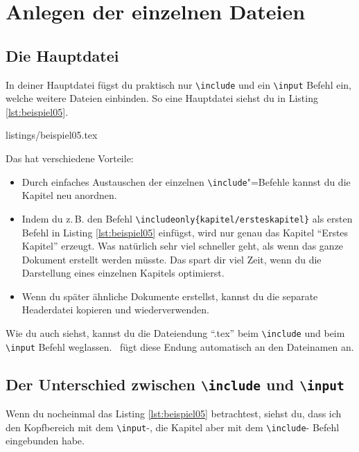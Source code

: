 \section{Anlegen der einzelnen Dateien}

\subsection{Die Hauptdatei}

In deiner Hauptdatei fügst du praktisch nur \texttt{\textbackslash include} und ein \texttt{\textbackslash input} Befehl ein, welche weitere Dateien einbinden. So eine Hauptdatei siehst du in Listing \ref{lst:beispiel05}.

%
	{listings/beispiel05.tex}

Das hat verschiedene Vorteile:

\begin{itemize}
	\item Durch einfaches Austauschen der einzelnen \texttt{\textbackslash include}"=Befehle kannst du die Kapitel neu anordnen.
	\item Indem du z.\,B. den Befehl \texttt{\textbackslash includeonly\{kapitel/ersteskapitel\}} als ersten Befehl in Listing \ref{lst:beispiel05} einfügst, wird nur genau das Kapitel \enquote{Erstes Kapitel} erzeugt. Was natürlich sehr viel schneller geht, als wenn das ganze Dokument erstellt werden müsste. Das spart dir viel Zeit, wenn du die Darstellung eines einzelnen Kapitels optimierst.
	\item Wenn du später ähnliche Dokumente erstellst, kannst du die separate Headerdatei kopieren und wiederverwenden.
\end{itemize}

Wie du auch siehst, kannst du die Dateiendung \enquote{.tex} beim \texttt{\textbackslash include} und beim \texttt{\textbackslash input} Befehl weglassen. \DMLLaTeX \ fügt diese Endung automatisch an den Dateinamen an.

\subsection{Der Unterschied zwischen \texttt{\textbackslash include} und \texttt{\textbackslash input}}

Wenn du nocheinmal das Listing \ref{lst:beispiel05} betrachtest, siehst du, dass ich den Kopfbereich mit dem \texttt{\textbackslash input}-, die Kapitel aber mit dem \texttt{\textbackslash include}- Befehl eingebunden habe.

